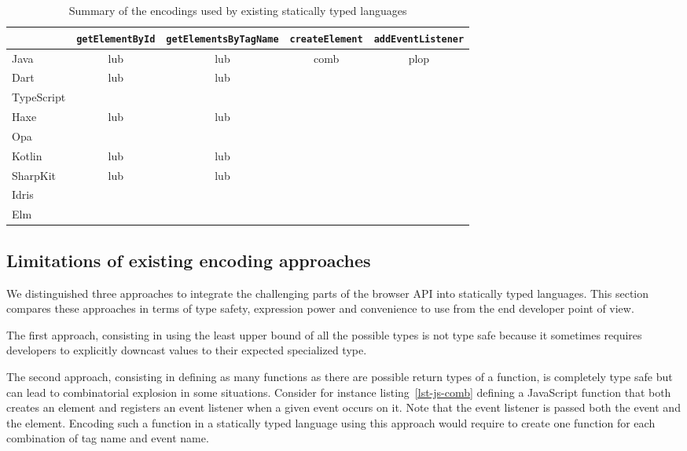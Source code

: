 \documentclass{llncs}
\newcommand{\jscode}[1]{\lstinline[language=JavaScript]|#1|}
\begin{document}
\begin{table}
\centering
\begin{tabular}{|l|c|c|c|c|}
\hline  & \jscode{getElementById} & \jscode{getElementsByTagName} & \jscode{createElement} & \jscode{addEventListener} \\
\hline Java & lub & lub & comb & plop \\
\hline Dart & lub & lub \\
\hline TypeScript \\
\hline Haxe & lub & lub \\
\hline Opa \\
\hline Kotlin & lub & lub \\
\hline SharpKit & lub & lub \\
\hline Idris \\
\hline Elm \\
\hline
\end{tabular}
\label{table-existing-encodings}
\caption{Summary of the encodings used by existing statically typed languages}
\end{table}

\subsection{Limitations of existing encoding approaches}

We distinguished three approaches to integrate the challenging parts of the browser API into statically typed languages. This section compares these approaches in terms of type safety, expression power and convenience to use from the end developer point of view.

The first approach, consisting in using the least upper bound of all the possible types is not type safe because it sometimes requires developers to explicitly downcast values to their expected specialized type.

The second approach, consisting in defining as many functions as there are possible return types of a function, is completely type safe but can lead to combinatorial explosion in some situations. Consider for instance listing~\ref{lst-js-comb} defining a JavaScript function that both creates an element and registers an event listener when a given event occurs on it. Note that the event listener is passed both the event and the element. Encoding such a function in a statically typed language using this approach would require to create one function for each combination of tag name and event name.
\end{document}
